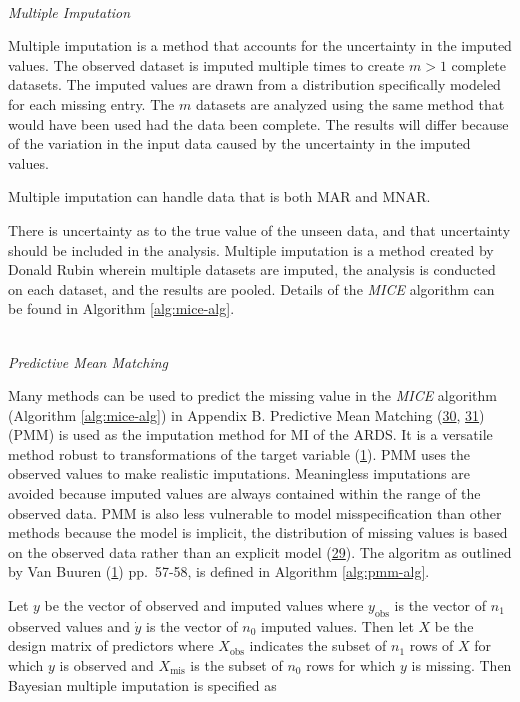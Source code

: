 \documentclass[12pt,]{article}
\begin{document}
\(~\)\\
\emph{Multiple Imputation}

Multiple imputation is a method that accounts for the uncertainty in the
imputed values. The observed dataset is imputed multiple times to create
\(m>1\) complete datasets. The imputed values are drawn from a
distribution specifically modeled for each missing entry. The \(m\)
datasets are analyzed using the same method that would have been used
had the data been complete. The results will differ because of the
variation in the input data caused by the uncertainty in the imputed
values.

Multiple imputation can handle data that is both MAR and MNAR.

There is uncertainty as to the true value of the unseen data, and that
uncertainty should be included in the analysis. Multiple imputation is a
method created by Donald Rubin wherein multiple datasets are imputed,
the analysis is conducted on each dataset, and the results are pooled.
Details of the \emph{MICE} algorithm can be found in Algorithm
\ref{alg:mice-alg}.

\(~\)\\
\emph{Predictive Mean Matching}

Many methods can be used to predict the missing value in the \emph{MICE}
algorithm (Algorithm \ref{alg:mice-alg}) in Appendix B. Predictive Mean
Matching (\protect\hyperlink{ref-rubin_statistical_1986}{30},
\protect\hyperlink{ref-little_missing-data_1988}{31}) (PMM) is used as
the imputation method for MI of the ARDS. It is a versatile method
robust to transformations of the target variable
(\protect\hyperlink{ref-van_buuren_flexible_2012}{1}). PMM uses the
observed values to make realistic imputations. Meaningless imputations
are avoided because imputed values are always contained within the range
of the observed data. PMM is also less vulnerable to model
misspecification than other methods because the model is implicit, the
distribution of missing values is based on the observed data rather than
an explicit model (\protect\hyperlink{ref-little_bayes_2014}{29}). The
algoritm as outlined by Van Buuren
(\protect\hyperlink{ref-van_buuren_flexible_2012}{1}) pp.~57-58, is
defined in Algorithm \ref{alg:pmm-alg}.

Let \(y\) be the vector of observed and imputed values where
\(y_{\text{obs}}\) is the vector of \(n_1\) observed values and
\(\dot{y}\) is the vector of \(n_0\) imputed values. Then let \(X\) be
the design matrix of predictors where \(X_{\text{obs}}\) indicates the
subset of \(n_1\) rows of \(X\) for which \(y\) is observed and
\(X_{\text{mis}}\) is the subset of \(n_0\) rows for which \(y\) is
missing. Then Bayesian multiple imputation is specified as
\end{document}
